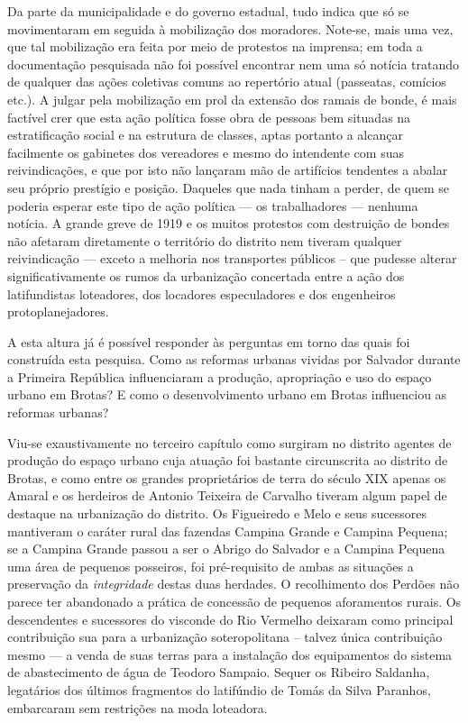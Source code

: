 Da parte da municipalidade e do governo estadual, tudo indica que só se movimentaram em seguida à mobilização dos moradores. Note-se, mais uma vez, que tal mobilização era feita por meio de protestos na imprensa; em toda a documentação pesquisada não foi possível encontrar nem uma só notícia tratando de qualquer das ações coletivas comuns ao repertório atual (passeatas, comícios etc.). A julgar pela mobilização em prol da extensão dos ramais de bonde, é mais factível crer que esta ação política fosse obra de pessoas bem situadas na estratificação social e na estrutura de classes, aptas portanto a alcançar facilmente os gabinetes dos vereadores e mesmo do intendente com suas reivindicações, e que por isto não lançaram mão de artifícios tendentes a abalar seu próprio prestígio e posição. Daqueles que nada tinham a perder, de quem se poderia esperar este tipo de ação política --- os trabalhadores --- nenhuma notícia. A grande greve de 1919 e os muitos protestos com destruição de bondes não afetaram diretamente o território do distrito nem tiveram qualquer reivindicação --- exceto a melhoria nos transportes públicos -- que pudesse alterar significativamente os rumos da urbanização concertada entre a ação dos latifundistas loteadores, dos locadores especuladores e dos engenheiros protoplanejadores.

A esta altura já é possível responder às perguntas em torno das quais foi construída esta pesquisa. Como as reformas urbanas vividas por Salvador durante a Primeira República influenciaram a produção, apropriação e uso do espaço urbano em Brotas? E como o desenvolvimento urbano em Brotas influenciou as reformas urbanas?

Viu-se exaustivamente no terceiro capítulo como surgiram no distrito agentes de produção do espaço urbano cuja atuação foi bastante circunscrita ao distrito de Brotas, e como entre os grandes proprietários de terra do século XIX apenas os Amaral e os herdeiros de Antonio Teixeira de Carvalho tiveram algum papel de destaque na urbanização do distrito. Os Figueiredo e Melo e seus sucessores mantiveram o caráter rural das fazendas Campina Grande e Campina Pequena; se a Campina Grande passou a ser o Abrigo do Salvador e a Campina Pequena uma área de pequenos posseiros, foi pré-requisito de ambas as situações a preservação da \textit{integridade} destas duas herdades. O recolhimento dos Perdões não parece ter abandonado a prática de concessão de pequenos aforamentos rurais. Os descendentes e sucessores do visconde do Rio Vermelho deixaram como principal contribuição sua para a urbanização soteropolitana -- talvez única contribuição mesmo --- a venda de suas terras para a instalação dos equipamentos do sistema de abastecimento de água de Teodoro Sampaio. Sequer os Ribeiro Saldanha, legatários dos últimos fragmentos do latifúndio de Tomás da Silva Paranhos, embarcaram sem restrições na moda loteadora. 

